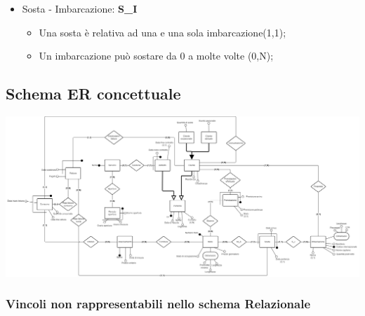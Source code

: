 \begin{itemize}
    \item Sosta - Imbarcazione: \textbf{S\_I}
    \begin{itemize}
        \item Una sosta è relativa ad una e una sola imbarcazione(1,1);
        \item Un imbarcazione può sostare da 0 a molte volte (0,N);
    \end{itemize}
    
\end{itemize}

\subsection{Schema ER concettuale}
\includegraphics[width=\textwidth]{img/erconcettuale.png}

\subsubsection{Vincoli non rappresentabili nello schema Relazionale}

